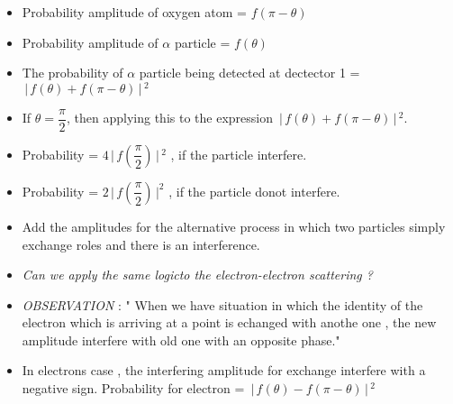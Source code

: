 \documentclass[aspectratio=169]{beamer}
\begin{document}
\begin{frame}
	\begin{itemize}
		\item Probability amplitude of oxygen atom = $f(\pi-\theta)$ \newline
		\item Probability amplitude of $\alpha$ particle = $f(\theta)$ \newline
		\item The probability of $\alpha$  particle 
		being detected at dectector 1 = $\,\Bigr\rvert\,f(\theta)+f(\pi-\theta)\,\Bigr\rvert\,^{2}$
		
 	\end{itemize}
\end{frame}

\begin{frame}
	\begin{itemize}
		\item If  $\theta = \dfrac{\pi}{2}$,  then applying this to the expression  $\,\Bigr\rvert\,f(\theta)+f(\pi-\theta)\,\Bigr\rvert\,^{2}$. \newline
		\item Probability = $4 \,\Bigr\rvert\,f\left(\dfrac{\pi}{2}\right) \,\Bigr\rvert\,^{2}$ , if the particle interfere. \newline
		\item Probability = $2 \,\Bigr\rvert\, f\left(\dfrac{\pi}{2}\right) \,\Bigr\rvert ^{2}$ , if the particle donot interfere.\newline
		\item Add the amplitudes for the alternative process in which two particles simply exchange roles and there is an interference. \newline
	\end{itemize}
\end{frame}

\begin{frame}
	\begin{itemize}
		\item \textit{Can we apply the same logicto the electron-electron scattering ? }\newline
		\item \textit{OBSERVATION} : " When we have situation in which the identity of the electron which is arriving at a point is echanged with anothe one , the new amplitude interfere with old one with an opposite phase." \newline
		\item In electrons case , the interfering amplitude for exchange interfere with a negative sign. \newline
		Probability for electron = $\,\Bigr\rvert\,f(\theta)-f(\pi-\theta)\,\Bigr\rvert\,^{2}$
		 \end{itemize}
\end{frame}
\end{document}
